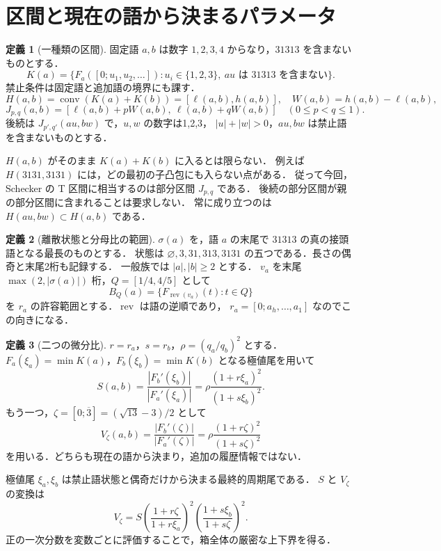 \documentclass[10pt,a4paper]{article}
\theoremstyle{definition}
\newtheorem{definition}{定義}
\newcommand{\conv}{\operatorname{conv}}
\newcommand{\eps}{\varnothing}
\begin{document}
\section{区間と現在の語から決まるパラメータ}
\begin{definition}[一種類の区間]\label{def:J}
固定語 $a,b$ は数字 $1,2,3,4$ からなり，$31313$ を含まないものとする．
\[
 K(a)=\{F_a([0;u_1,u_2,\ldots]):u_i\in\{1,2,3\},\
                   au\text{ は }31313\text{ を含まない}\}.
\]
禁止条件は固定語と追加語の境界にも課す．
\[
 H(a,b)=\conv(K(a)+K(b))=[\ell(a,b),h(a,b)],
 \quad W(a,b)=h(a,b)-\ell(a,b),
\]
\[
 J_{p,q}(a,b)=[\ell(a,b)+pW(a,b),\ \ell(a,b)+qW(a,b)]
 \quad(0\le p<q\le1).
\]
後続は $J_{p',q'}(au,bw)$ で，$u,w$ の数字は1,2,3，
$|u|+|w|>0$，$au,bw$ は禁止語を含まないものとする．
\end{definition}

$H(a,b)$ がそのまま $K(a)+K(b)$ に入るとは限らない．
例えば $H(3131,3131)$ には，どの最初の子凸包にも入らない点がある．
従って今回，Schecker の T 区間に相当するのは部分区間 $J_{p,q}$ である．
後続の部分区間が親の部分区間に含まれることは要求しない．
常に成り立つのは $H(au,bw)\subset H(a,b)$ である．

\begin{definition}[離散状態と分母比の範囲]
$\sigma(a)$ を，語 $a$ の末尾で $31313$ の真の接頭語となる最長のものとする．
状態は $\eps,3,31,313,3131$ の五つである．長さの偶奇と末尾2桁も記録する．
一般族では $|a|,|b|\ge2$ とする．
$v_a$ を末尾 $\max(2,|\sigma(a)|)$ 桁，$Q=[1/4,4/5]$ として
\[
 B_Q(a)=\{F_{\operatorname{rev}(v_a)}(t):t\in Q\}
\]
を $r_a$ の許容範囲とする．$\operatorname{rev}$ は語の逆順であり，
$r_a=[0;a_h,\ldots,a_1]$ なのでこの向きになる．
\end{definition}

\begin{definition}[二つの微分比]\label{def:scales}
$r=r_a$，$s=r_b$，$\rho=(q_a/q_b)^2$ とする．
$F_a(\xi_a)=\min K(a)$，$F_b(\xi_b)=\min K(b)$ となる極値尾を用いて
\[
 S(a,b)=\frac{|F_b'(\xi_b)|}{|F_a'(\xi_a)|}
       =\rho\frac{(1+r\xi_a)^2}{(1+s\xi_b)^2}.
\]
もう一つ，$\zeta=[0;\overline3]=(\sqrt{13}-3)/2$ として
\[
 V_\zeta(a,b)=\frac{|F_b'(\zeta)|}{|F_a'(\zeta)|}
            =\rho\frac{(1+r\zeta)^2}{(1+s\zeta)^2}
\]
を用いる．どちらも現在の語から決まり，追加の履歴情報ではない．
\end{definition}

極値尾 $\xi_a,\xi_b$ は禁止語状態と偶奇だけから決まる最終的周期尾である．
$S$ と $V_\zeta$ の変換は
\[
 V_\zeta
 =S\left(\frac{1+r\zeta}{1+r\xi_a}\right)^2
    \left(\frac{1+s\xi_b}{1+s\zeta}\right)^2.                 \tag{1}
\]
正の一次分数を変数ごとに評価することで，箱全体の厳密な上下界を得る．
\end{document}
